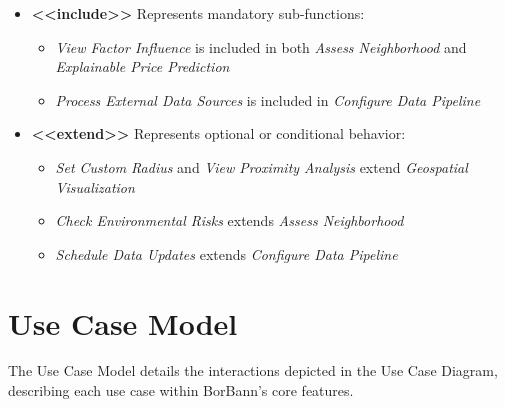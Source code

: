 \begin{itemize}
	\item \textbf{\textless{}\textless{}include\textgreater{}\textgreater{}}  
	      Represents mandatory sub-functions:
	      \begin{itemize}
	      	\item \textit{View Factor Influence} is included in both \textit{Assess Neighborhood} and \textit{Explainable Price Prediction}
	      	\item \textit{Process External Data Sources} is included in \textit{Configure Data Pipeline}
	      \end{itemize}
	      
	\item \textbf{\textless{}\textless{}extend\textgreater{}\textgreater{}}  
	      Represents optional or conditional behavior:
	      \begin{itemize}
	      	\item \textit{Set Custom Radius} and \textit{View Proximity Analysis} extend \textit{Geospatial Visualization}
	      	\item \textit{Check Environmental Risks} extends \textit{Assess Neighborhood}
	      	\item \textit{Schedule Data Updates} extends \textit{Configure Data Pipeline}
	      \end{itemize}
\end{itemize}

\section{Use Case Model}

The Use Case Model details the interactions depicted in the Use Case Diagram, describing each use case within BorBann's core features.

